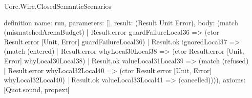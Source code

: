 \begin{lexlean}{Uorc.Wire.ClosedSemanticScenarios}
\begin{semanticmodule}
definition{
  name: run,
  parameters: [],
  result: (Result Unit Error),
  body: (match (mismatchedArenaBudget)
    | Result.error guardFailureLocal36 => (ctor Result.error [Unit, Error] guardFailureLocal36)
    | Result.ok ignoredLocal37 => (match (entered)
      | Result.error whyLocal30Local38 => (ctor Result.error [Unit, Error] whyLocal30Local38)
      | Result.ok valueLocal31Local39 => (match (refused)
        | Result.error whyLocal32Local40 => (ctor Result.error [Unit, Error] whyLocal32Local40)
        | Result.ok valueLocal33Local41 => (cancelled)))),
  axioms: [Quot.sound, propext]
}
\end{semanticmodule}
\end{lexlean}
